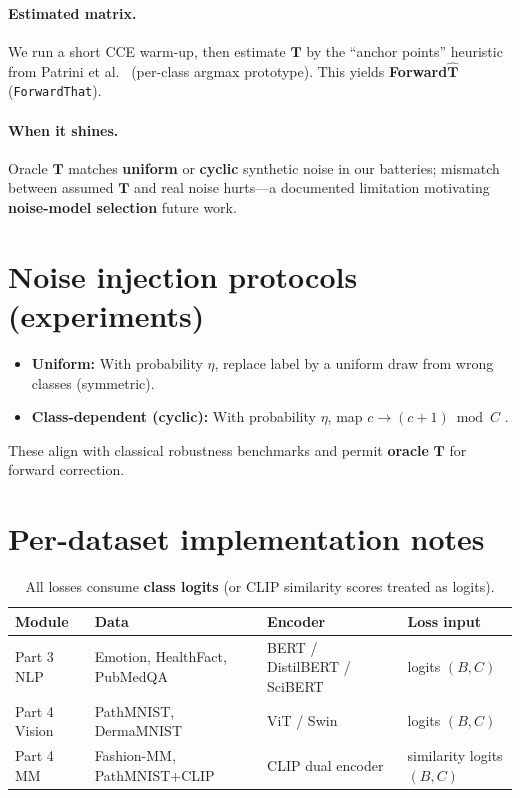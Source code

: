 \documentclass[11pt,a4paper]{article}
\begin{document}
\paragraph{Estimated matrix.}
We run a short CCE warm-up, then estimate $\hat{\mathbf{T}}$ by the ``anchor points'' heuristic from Patrini et al.\ \cite{patrini2017} (per-class argmax prototype). This yields \textbf{Forward$\hat{\mathbf{T}}$} (\texttt{ForwardThat}).

\paragraph{When it shines.}
Oracle $\mathbf{T}$ matches \textbf{uniform} or \textbf{cyclic} synthetic noise in our batteries; mismatch between assumed $\mathbf{T}$ and real noise hurts---a documented limitation motivating \textbf{noise-model selection} future work.

\section{Noise injection protocols (experiments)}

\begin{itemize}[leftmargin=*]
  \item \textbf{Uniform:} With probability $\eta$, replace label by a uniform draw from wrong classes (symmetric).
  \item \textbf{Class-dependent (cyclic):} With probability $\eta$, map $c \to (c+1)\bmod C$ \cite{patrini2017}.
\end{itemize}

These align with classical robustness benchmarks and permit \textbf{oracle} $\mathbf{T}$ for forward correction.

\section{Per-dataset implementation notes}

\begin{table}[h]
\centering
\small
\begin{tabular}{@{}llll@{}}
\toprule
\textbf{Module} & \textbf{Data} & \textbf{Encoder} & \textbf{Loss input} \\
\midrule
Part 3 NLP & Emotion, HealthFact, PubMedQA & BERT / DistilBERT / SciBERT & logits $(B,C)$ \\
Part 4 Vision & PathMNIST, DermaMNIST & ViT / Swin & logits $(B,C)$ \\
Part 4 MM & Fashion-MM, PathMNIST+CLIP & CLIP dual encoder & similarity logits $(B,C)$ \\
\bottomrule
\end{tabular}
\caption{All losses consume \textbf{class logits} (or CLIP similarity scores treated as logits).}
\end{table}
\end{document}
